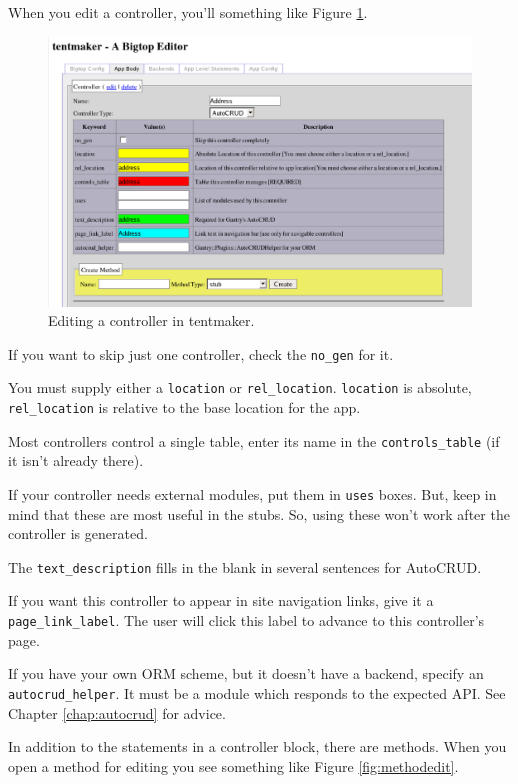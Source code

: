 When you edit a controller, you'll something like Figure
\ref{fig:controledit}.

\begin{figure}
\includegraphics[width=6in]{controledit}
\caption{Editing a controller in tentmaker.}
\label{fig:controledit}
\end{figure}

If you want to skip just one controller, check the \verb+no_gen+ for it.

You must supply either a \verb+location+ or \verb+rel_location+.
\verb+location+ is absolute, \verb+rel_location+ is relative to the
base location for the app.

Most controllers control a single table, enter its name in the
\verb+controls_table+ (if it isn't already there).

If your controller needs external modules, put them in \verb+uses+ boxes.
But, keep in mind that these are most useful in the stubs.  So, using
these won't work after the controller is generated.

The \verb+text_description+ fills in the blank in several sentences for
AutoCRUD.

If you want this controller to appear in site navigation links, give
it a \verb+page_link_label+.  The user will click this label to advance
to this controller's page.

If you have your own ORM scheme, but it doesn't have a backend, specify
an \verb+autocrud_helper+.  It must be a module which responds to the
expected API.  See Chapter \ref{chap:autocrud} for advice.

In addition to the statements in a controller block, there are methods.
When you open a method for editing you see something like Figure
\ref{fig:methodedit}.

